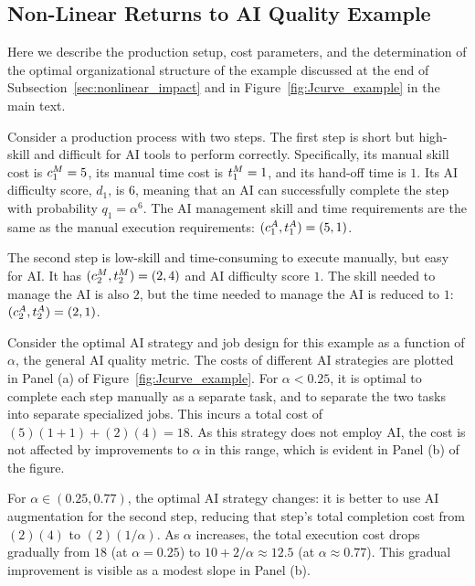 \subsection{Non-Linear Returns to AI Quality Example}
\label{app:discussion_examples_nonlinear_impact}

Here we describe the production setup, cost parameters, and the determination of the optimal organizational structure of the example discussed at the end of Subsection~\ref{sec:nonlinear_impact} and in Figure~\ref{fig:Jcurve_example} in the main text.  

\begin{example}
Consider a production process with two steps.  
The first step is short but high-skill and difficult for AI tools to perform correctly.  
Specifically, its manual skill cost is $c^{M}_{1} = 5$, its manual time cost is $t^{M}_{1} = 1$, and its hand-off time is $1$.  
Its AI difficulty score, $d_1$, is $6$, meaning that an AI can successfully complete the step with probability $q_1 = \alpha^6$.  
The AI management skill and time requirements are the same as the manual execution requirements: $(c^{A}_{1}, t^{A}_{1}) = (5,1)$.

The second step is low-skill and time-consuming to execute manually, but easy for AI.  
It has $(c^{M}_{2}, t^{M}_{2}) = (2,4)$ and AI difficulty score $1$.  
The skill needed to manage the AI is also $2$, but the time needed to manage the AI is reduced to $1$: $(c^{A}_{2}, t^{A}_{2}) = (2,1)$.

Consider the optimal AI strategy and job design for this example as a function of $\alpha$, the general AI quality metric.  
The costs of different AI strategies are plotted in Panel (a) of Figure~\ref{fig:Jcurve_example}.  
For $\alpha < 0.25$, it is optimal to complete each step manually as a separate task, and to separate the two tasks into separate specialized jobs. 
This incurs a total cost of $(5)(1+1) + (2)(4) = 18$.  
As this strategy does not employ AI, the cost is not affected by improvements to $\alpha$ in this range, which is evident in Panel (b) of the figure.

For $\alpha \in (0.25, 0.77)$, the optimal AI strategy changes: it is better to use AI augmentation for the second step, reducing that step's total completion cost from $(2)(4)$ to $(2)(1/\alpha)$.  
As $\alpha$ increases, the total execution cost drops gradually from $18$ (at $\alpha = 0.25$) to $10 + 2/\alpha \approx 12.5$ (at $\alpha \approx 0.77$). 
This gradual improvement is visible as a modest slope in Panel (b).


\end{example}
